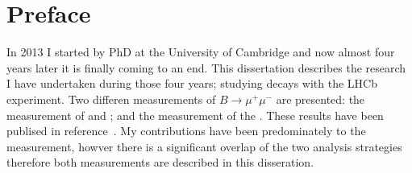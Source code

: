 \chapter{Preface}

In 2013 I started by PhD at the University of Cambridge and now almost four years later it is finally coming to an end. This dissertation describes the research I have undertaken during those four years; studying \bmumu decays with the LHCb experiment. Two differen measurements of $B \to \mu^{+} \mu^{-}$ are presented: the measurement of \bdmumu and \bsmumu \BFs; and the measurement of the \bsmumu \el. These results have been publised in reference~\cite{Aaij:2017vad}. My contributions have been predominately to the \el measurement, howver there is a significant overlap of the two analysis strategies therefore both measurements are described in this disseration.

